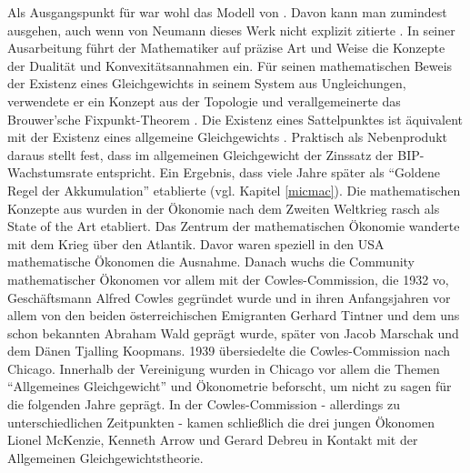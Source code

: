 Als Ausgangspunkt für \textcite{Neumann1937, Neumann1945} war wohl das Modell von \textcite{Cassel1918}. Davon kann man zumindest ausgehen, auch wenn von Neumann dieses Werk nicht explizit zitierte \parencite[S. 129]{Kurz1993}. In seiner Ausarbeitung führt der Mathematiker auf präzise Art und Weise die Konzepte der Dualität und Konvexitätsannahmen ein. Für seinen mathematischen Beweis der Existenz eines Gleichgewichts in seinem System aus Ungleichungen, verwendete er ein Konzept aus der Topologie und verallgemeinerte das Brouwer'sche Fixpunkt-Theorem \parencite[S. 1]{Neumann1945}. Die Existenz eines Sattelpunktes ist äquivalent mit der Existenz eines allgemeine Gleichgewichts \parencite[S. 14]{Weintraub1983}. Praktisch als Nebenprodukt daraus stellt \textcite{Neumann1945} fest, dass im allgemeinen Gleichgewicht der Zinssatz der BIP-Wachstumsrate entspricht. Ein Ergebnis, dass viele Jahre später \textcite{Phelps1961} als "`Goldene Regel der Akkumulation"' etablierte (vgl. Kapitel \ref{micmac}). Die mathematischen Konzepte aus \textcite{Neumann1945} wurden in der Ökonomie nach dem Zweiten Weltkrieg rasch als State of the Art etabliert. Das Zentrum der mathematischen Ökonomie wanderte mit dem Krieg über den Atlantik. Davor waren speziell in den USA mathematische Ökonomen die Ausnahme. Danach wuchs die Community mathematischer Ökonomen vor allem mit der Cowles-Commission, die 1932 vo, Geschäftsmann Alfred Cowles gegründet wurde und in ihren Anfangsjahren vor allem von den beiden österreichischen Emigranten Gerhard Tintner und dem uns schon bekannten Abraham Wald geprägt wurde, später von Jacob Marschak und dem Dänen Tjalling Koopmans. 1939 übersiedelte die Cowles-Commission nach Chicago. Innerhalb der Vereinigung wurden in Chicago vor allem die Themen "`Allgemeines Gleichgewicht"' und Ökonometrie beforscht, um nicht zu sagen für die folgenden Jahre geprägt. In der Cowles-Commission - allerdings zu unterschiedlichen Zeitpunkten - kamen schließlich die drei jungen Ökonomen Lionel McKenzie, Kenneth Arrow und Gerard Debreu in Kontakt mit der Allgemeinen Gleichgewichtstheorie.  

